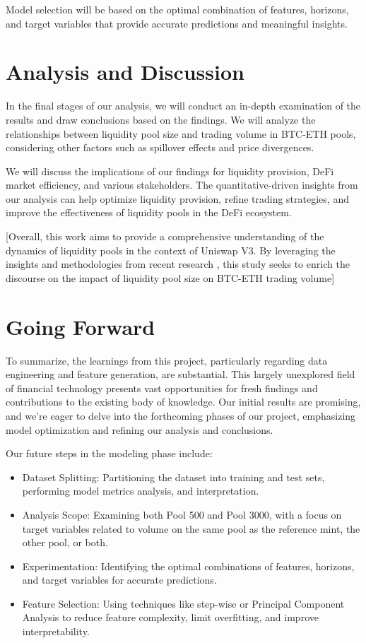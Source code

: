 \documentclass{article}
\begin{document}
Model selection will be based on the optimal combination of features, horizons, and target variables that provide accurate predictions and meaningful insights.

\section*{\textbf{Analysis and Discussion}}

In the final stages of our analysis, we will conduct an in-depth examination of the results and draw conclusions based on the findings. We will analyze the relationships between liquidity pool size and trading volume in BTC-ETH pools, considering other factors such as spillover effects and price divergences.

We will discuss the implications of our findings for liquidity provision, DeFi market efficiency, and various stakeholders. The quantitative-driven insights from our analysis can help optimize liquidity provision, refine trading strategies, and improve the effectiveness of liquidity pools in the DeFi ecosystem.


[Overall, this work aims to provide a comprehensive understanding of the dynamics of liquidity pools in the context of Uniswap V3. By leveraging the insights and methodologies from recent research \cite{defi2023uniswap, makarov2021cryptocurrencies, defi-characterisation-2023, impermanentloss2023, yield_farming_protocols, risksreturns2023, uniswapv3math2023}, this study seeks to enrich the discourse on the impact of liquidity pool size on BTC-ETH trading volume]

\section*{Going Forward}

To summarize, the learnings from this project, particularly regarding data engineering and feature generation, are substantial. This largely unexplored field of financial technology presents vast opportunities for fresh findings and contributions to the existing body of knowledge. Our initial results are promising, and we're eager to delve into the forthcoming phases of our project, emphasizing model optimization and refining our analysis and conclusions.

Our future steps in the modeling phase include:

\begin{itemize}
\item Dataset Splitting: Partitioning the dataset into training and test sets, performing model metrics analysis, and interpretation.
\item Analysis Scope: Examining both Pool 500 and Pool 3000, with a focus on target variables related to volume on the same pool as the reference mint, the other pool, or both.
\item Experimentation: Identifying the optimal combinations of features, horizons, and target variables for accurate predictions.
\item Feature Selection: Using techniques like step-wise or Principal Component Analysis to reduce feature complexity, limit overfitting, and improve interpretability.
\end{itemize}
\end{document}
